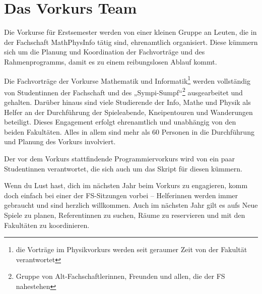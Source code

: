 \vspace{-3mm}

\section{Das Vorkurs Team}
\vspace{-1mm}

Die Vorkurse für Erstsemester werden von einer kleinen Gruppe an Leuten, die in der Fachschaft MathPhysInfo tätig sind, ehrenamtlich organisiert. Diese kümmern sich um die Planung und Koordination der Fachvorträge und des Rahmenprogramms, damit es zu einem reibungslosen Ablauf kommt.

Die Fachvorträge der Vorkurse Mathematik und Informatik\footnote{die Vorträge im Physikvorkurs werden seit geraumer Zeit von der Fakultät verantwortet} werden vollständig von Studentinnen der Fachschaft und des „Sympi-Sumpf“\footnote{Gruppe von Alt-Fachschaftlerinnen, Freunden und allen, die der FS nahestehen} ausgearbeitet und gehalten. Darüber hinaus sind viele Studierende der Info, Mathe und Physik als Helfer an der Durchführung der Spieleabende, Kneipentouren und Wanderungen beteiligt. Dieses Engagement erfolgt ehrenamtlich und unabhängig von den beiden Fakultäten. Alles in allem sind mehr als 60 Personen in die Durchführung und Planung des Vorkurs involviert.

Der vor dem Vorkurs stattfindende Programmiervorkurs wird von ein paar Studentinnen verantwortet, die sich auch um das Skript für diesen kümmern.

Wenn du Lust hast, dich im nächsten Jahr beim Vorkurs zu engagieren, komm doch einfach bei einer der FS-Sitzungen vorbei -- Helferinnen werden immer gebraucht und sind herzlich willkommen. Auch im nächsten Jahr gilt es aufs Neue Spiele zu planen, Referentinnen zu suchen, Räume zu reservieren und mit den Fakultäten zu koordinieren.
